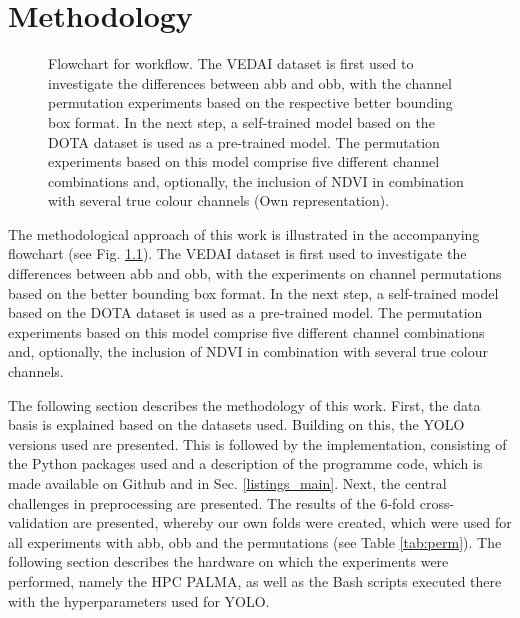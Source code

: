 \chapter{Methodology}
\label{ch:methodology}
\begin{figure}[htbp]
    \centering
    
    \caption[Flowchart for workflow]{Flowchart for workflow. The VEDAI dataset is first used to investigate the differences between \acrshort{abb} and \acrshort{obb}, with the channel permutation experiments based on the respective better bounding box format. In the next step, a self-trained model based on the DOTA dataset is used as a pre-trained model. The permutation experiments based on this model comprise five different channel combinations and, optionally, the inclusion of NDVI in combination with several true colour channels (Own representation).}
    \label{fig:Flowchart}
\end{figure}

The methodological approach of this work is illustrated in the accompanying flowchart (see Fig. \ref{fig:Flowchart}). The \acrshort{VEDAI} dataset is first used to investigate the differences between \acrshort{abb} and \acrshort{obb}, with the experiments on channel permutations based on the better bounding box format. In the next step, a self-trained model based on the DOTA dataset is used as a pre-trained model. The permutation experiments based on this model comprise five different channel combinations and, optionally, the inclusion of NDVI in combination with several true colour channels.

The following section describes the methodology of this work. First, the data basis is explained based on the datasets used. Building on this, the \acrshort{YOLO} versions used are presented. This is followed by the implementation, consisting of the Python packages used and a description of the programme code, which is made available on Github \cite{Github_timo} and in Sec. \ref{listings_main}. Next, the central challenges in preprocessing are presented. The results of the 6-fold cross-validation are presented, whereby our own folds were created, which were used for all experiments with \acrshort{abb}, \acrshort{obb} and the permutations (see Table \ref{tab:perm}). The following section describes the hardware on which the experiments were performed, namely the \acrlong{HPC} \acrshort{PALMA}, as well as the Bash scripts executed there with the hyperparameters used for \acrshort{YOLO}.



